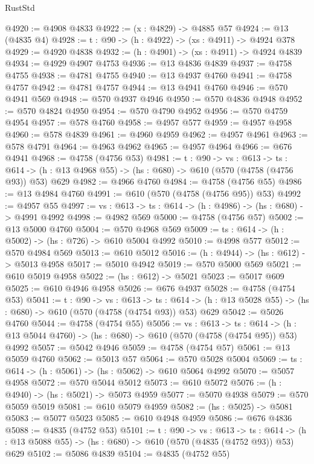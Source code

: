 \begin{lexlean}{RustStd}
\begin{coremodule}
@4920 := @4908 @4833
@4922 := (x : @4829) -> @4885 @57
@4924 := @13 (@4835 @4)
@4928 := {t : @90} -> (h : @4922) -> (xs : @4911) -> @4924 @378
@4929 := @4920 @4838
@4932 := (h : @4901) -> (xs : @4911) -> @4924 @4839
@4934 := @4929 @4907 @4753
@4936 := @13 @4836 @4839
@4937 := @4758 @4755
@4938 := @4781 @4755
@4940 := @13 @4937 @4760
@4941 := @4758 @4757
@4942 := @4781 @4757
@4944 := @13 @4941 @4760
@4946 := @570 @4941 @569
@4948 := @570 @4937 @4946
@4950 := @570 @4836 @4948
@4952 := @570 @4824 @4950
@4954 := @570 @4790 @4952
@4956 := @570 @4759 @4954
@4957 := @578 @4760
@4958 := @4957 @577
@4959 := @4957 @4958
@4960 := @578 @4839
@4961 := @4960 @4959
@4962 := @4957 @4961
@4963 := @578 @4791
@4964 := @4963 @4962
@4965 := @4957 @4964
@4966 := @676 @4941
@4968 := @4758 (@4756 @53)
@4981 := {t : @90} ->
  {vs : @613} ->
  {ts : @614} -> (h : @13 @4968 @55) -> (hs : @680) -> @610 (@570 (@4758 (@4756 @93)) @53) @629
@4982 := @4966 @4760
@4984 := @4758 (@4756 @55)
@4986 := @13 @4984 @4760
@4991 := @610 (@570 (@4758 (@4756 @95)) @53)
@4992 := @4957 @55
@4997 := {vs : @613} -> {ts : @614} -> (h : @4986) -> (hs : @680) -> @4991 @4992
@4998 := @4982 @569
@5000 := @4758 (@4756 @57)
@5002 := @13 @5000 @4760
@5004 := @570 @4968 @569
@5009 := {ts : @614} -> (h : @5002) -> (hs : @726) -> @610 @5004 @4992
@5010 := @4998 @577
@5012 := @570 @4984 @569
@5013 := @610 @5012
@5016 := (h : @4944) -> (hs : @612) -> @5013 @4958
@5017 := @5010 @4942
@5019 := @570 @5000 @569
@5021 := @610 @5019 @4958
@5022 := (hs : @612) -> @5021
@5023 := @5017 @609
@5025 := @610 @4946 @4958
@5026 := @676 @4937
@5028 := @4758 (@4754 @53)
@5041 := {t : @90} ->
  {vs : @613} ->
  {ts : @614} -> (h : @13 @5028 @55) -> (hs : @680) -> @610 (@570 (@4758 (@4754 @93)) @53) @629
@5042 := @5026 @4760
@5044 := @4758 (@4754 @55)
@5056 := {vs : @613} ->
  {ts : @614} -> (h : @13 @5044 @4760) -> (hs : @680) -> @610 (@570 (@4758 (@4754 @95)) @53) @4992
@5057 := @5042 @4946
@5059 := @4758 (@4754 @57)
@5061 := @13 @5059 @4760
@5062 := @5013 @57
@5064 := @570 @5028 @5004
@5069 := {ts : @614} -> (h : @5061) -> (hs : @5062) -> @610 @5064 @4992
@5070 := @5057 @4958
@5072 := @570 @5044 @5012
@5073 := @610 @5072
@5076 := (h : @4940) -> (hs : @5021) -> @5073 @4959
@5077 := @5070 @4938
@5079 := @570 @5059 @5019
@5081 := @610 @5079 @4959
@5082 := (hs : @5025) -> @5081
@5083 := @5077 @5023
@5085 := @610 @4948 @4959
@5086 := @676 @4836
@5088 := @4835 (@4752 @53)
@5101 := {t : @90} ->
  {vs : @613} ->
  {ts : @614} -> (h : @13 @5088 @55) -> (hs : @680) -> @610 (@570 (@4835 (@4752 @93)) @53) @629
@5102 := @5086 @4839
@5104 := @4835 (@4752 @55)

\end{coremodule}
\end{lexlean}
